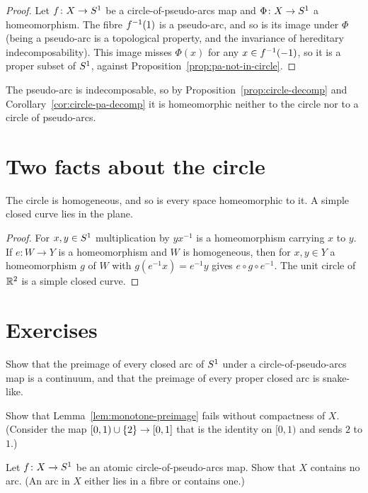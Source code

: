 \begin{proof}
Let $f\colon X\to S^1$ be a circle-of-pseudo-arcs map and $\Phi\colon X\to S^1$ a homeomorphism. The fibre $f^{-1}(1)$ is a pseudo-arc, and so is its image
under $\Phi$ (being a pseudo-arc is a topological property,  and the invariance of hereditary indecomposability). This image misses
$\Phi(x)$ for any $x\in f^{-1}(-1)$, so it is a proper subset of $S^1$, against Proposition~\ref{prop:pa-not-in-circle}.
\end{proof}


The pseudo-arc is indecomposable, so by Proposition~\ref{prop:circle-decomp} and Corollary~\ref{cor:circle-pa-decomp} it is homeomorphic neither to the circle
nor to a circle of pseudo-arcs.

\section{Two facts about the circle}

\begin{proposition}\label{prop:circle-homog}
The circle is homogeneous, and so is every space homeomorphic to it. A simple closed curve lies in the plane.
\end{proposition}

\begin{proof}
For $x,y\in S^1$ multiplication by $yx^{-1}$ is a homeomorphism carrying $x$ to $y$. If $e\colon W\to Y$ is a homeomorphism and $W$ is homogeneous, then
for $x,y\in Y$ a homeomorphism $g$ of $W$ with $g(e^{-1}x)=e^{-1}y$ gives $e\circ g\circ e^{-1}$. The unit circle of $\mathbb{R}^2$ is a simple closed curve.
\end{proof}


\section*{Exercises}

\begin{exercise}
Show that the preimage of every closed arc of $S^1$ under a circle-of-pseudo-arcs map is a continuum, and that the preimage of every proper closed arc is
snake-like.
\end{exercise}

\begin{exercise}
Show that Lemma~\ref{lem:monotone-preimage} fails without compactness of $X$. (Consider the map $[0,1)\cup\left\{ 2 \right\}\to[0,1]$ that is the identity on $[0,1)$ and
sends $2$ to $1$.)
\end{exercise}

\begin{exercise}
Let $f\colon X\to S^1$ be an atomic circle-of-pseudo-arcs map. Show that $X$ contains no arc. (An arc in $X$ either lies in a fibre or contains one.)
\end{exercise}
